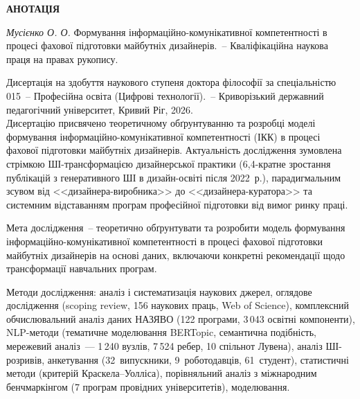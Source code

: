 \begin{center}
{\large \textbf{АНОТАЦІЯ}}
\end{center}

\textit{Мусієнко О. О.} Формування інформаційно-комунікативної компетентності в процесі фахової підготовки майбутніх дизайнерів.~-- Кваліфікаційна наукова праця на правах рукопису.

Дисертація на здобуття наукового ступеня доктора філософії за спеціальністю 015~-- Професійна освіта (Цифрові технології).~-- Криворізький державний педагогічний університет, Кривий Ріг, 2026.\\

Дисертацію присвячено теоретичному обґрунтуванню та розробці моделі формування інформаційно-комунікативної компетентності (ІКК) в процесі фахової підготовки майбутніх дизайнерів. Актуальність дослідження зумовлена стрімкою ШІ-трансформацією дизайнерської практики (6,4-кратне зростання публікацій з генеративного ШІ в дизайн-освіті після 2022~р.), парадигмальним зсувом від <<дизайнера-виробника>> до <<дизайнера-куратора>> та системним відставанням програм професійної підготовки від вимог ринку праці.

Мета дослідження~-- теоретично обґрунтувати та розробити модель формування інформаційно-комунікативної компетентності в процесі фахової підготовки майбутніх дизайнерів на основі даних, включаючи конкретні рекомендації щодо трансформації навчальних програм.

Методи дослідження: аналіз і систематизація наукових джерел, оглядове дослідження (scoping review, 156 наукових праць, Web of Science), комплексний обчислювальний аналіз даних НАЗЯВО (122 програми, 3\,043 освітні компоненти), NLP-методи (тематичне моделювання BERTopic, семантична подібність, мережевий аналіз~--- 1\,240 вузлів, 7\,524 ребер, 10 спільнот Лувена), аналіз ШІ-розривів, анкетування (32~випускники, 9~роботодавців, 61~студент), статистичні методи (критерій Краскела--Уолліса), порівняльний аналіз з міжнародним бенчмаркінгом (7 програм провідних університетів), моделювання.

